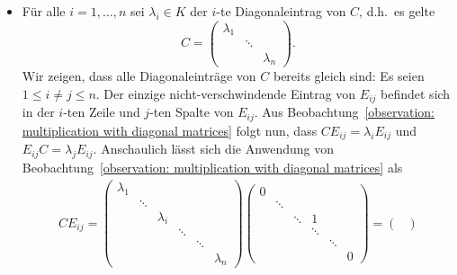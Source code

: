 \begin{itemize}
  \item
    Für alle $i = 1, \dotsc, n$ sei $\lambda_i \in K$ der $i$-te Diagonaleintrag von $C$, d.h.\ es gelte
    \[
        C
      = \begin{pmatrix}
          \lambda_1 &         &           \\
                    & \ddots  &           \\
                    &         & \lambda_n
        \end{pmatrix}.
    \]
    Wir zeigen, dass alle Diagonaleinträge von $C$ bereits gleich sind:
    Es seien $1 \leq i \neq j \leq n$.
    Der einzige nicht-verschwindende Eintrag von $E_{ij}$ befindet sich in der $i$-ten Zeile und $j$-ten Spalte von $E_{ij}$.
    Aus Beobachtung~\ref{observation: multiplication with diagonal matrices} folgt nun, dass $C E_{ij} = \lambda_i E_{ij}$ und $E_{ij} C = \lambda_j E_{ij}$.
    Anschaulich lässt sich die Anwendung von Beobachtung~\ref{observation: multiplication with diagonal matrices} als
    \begin{gather*}
        C E_{ij}
      = \begin{pmatrix}
          \lambda_1 &         &           &         &         &           \\
                    & \ddots  &           &         &         &           \\
                    &         & \lambda_i &         &         &           \\
                    &         &           & \ddots  &         &           \\
                    &         &           &         & \ddots  &           \\
                    &         &           &         &         & \lambda_n
        \end{pmatrix}
        \begin{pmatrix}
          0 &         &         &           &         &   \\
            & \ddots  &         &           &         &   \\
            &         & \ddots  & 1         &         &   \\
            &         &         & \ddots    &         &   \\
            &         &         &           & \ddots  &   \\
            &         &         &           &         & 0
        \end{pmatrix}
      = \begin{pmatrix}

\end{pmatrix}
\end{gather*}
\end{itemize}
